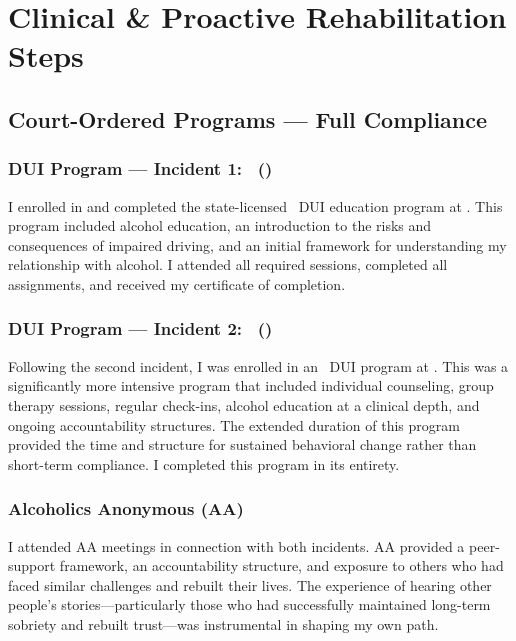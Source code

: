 \section{Clinical \& Proactive Rehabilitation Steps}

\subsection{Court-Ordered Programs --- Full Compliance}

\subsubsection{DUI Program --- Incident 1: \DUIProgramOne\ (\DUIProgramOneDuration)}

I enrolled in and completed the state-licensed \DUIProgramOneDuration\ DUI education program at \DUIProgramOne. This program included alcohol education, an introduction to the risks and consequences of impaired driving, and an initial framework for understanding my relationship with alcohol. I attended all required sessions, completed all assignments, and received my certificate of completion.

\subsubsection{DUI Program --- Incident 2: \DUIProgramTwo\ (\DUIProgramTwoDuration)}

Following the second incident, I was enrolled in an \DUIProgramTwoDuration\ DUI program at \DUIProgramTwo. This was a significantly more intensive program that included individual counseling, group therapy sessions, regular check-ins, alcohol education at a clinical depth, and ongoing accountability structures. The extended duration of this program provided the time and structure for sustained behavioral change rather than short-term compliance. I completed this program in its entirety.

\subsubsection{Alcoholics Anonymous (AA)}

I attended AA meetings in connection with both incidents. AA provided a peer-support framework, an accountability structure, and exposure to others who had faced similar challenges and rebuilt their lives. The experience of hearing other people's stories---particularly those who had successfully maintained long-term sobriety and rebuilt trust---was instrumental in shaping my own path.

